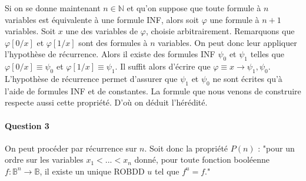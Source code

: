 \documentclass[a4paper,11pt]{article}
\begin{document}
		Si on se donne maintenant $n \in \mathbb{N}$ et qu'on suppose que toute formule à $n$ variables est équivalente à une formule INF, alors soit $\varphi$ une formule à $n+1$ variables. Soit $x$ une des variables de $\varphi$, choisie arbitrairement. Remarquons que $\varphi[0/x]$ et $\varphi[1/x]$ sont des formules à $n$ variables. On peut donc leur appliquer l'hypothèse de récurrence. Alors il existe des formules INF $\psi_0$ et $\psi_1$ telles que $\varphi[0/x] \equiv \psi_0$ et $\varphi[1/x] \equiv \psi_1$. Il suffit alors d'écrire que $\varphi \equiv x \rightarrow \psi_1, \psi_0$. L'hypothèse de récurrence permet d'assurer que $\psi_1$ et $\psi_0$ ne sont écrites qu'à l'aide de formules INF et de constantes. La formule que nous venons de construire respecte aussi cette propriété. D'où on déduit l'hérédité.
		
		\paragraph{Question 3} On peut procéder par récurrence sur $n$.
		Soit donc la propriété $P(n)$ : "pour un ordre sur les variables $x_1 < ... < x_n$ donné, pour toute fonction booléenne $f : \mathbb{B}^n \rightarrow \mathbb{B}$, il existe un unique ROBDD $u$ tel que $f^u = f$."
		
\end{document}
